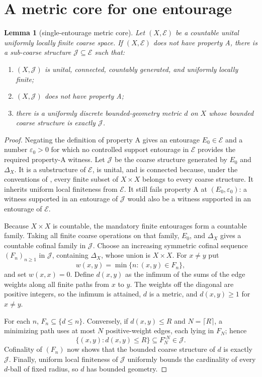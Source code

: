 \documentclass[11pt]{article}
\newtheorem{lemma}{Lemma}
\newcommand{\E}{\mathcal E}
\newcommand{\J}{\mathcal J}
\begin{document}
\section*{A metric core for one entourage}
\begin{lemma}[single-entourage metric core]\label{lem:core}
Let $(X,\E)$ be a countable unital uniformly locally finite coarse space.  If
$(X,\E)$ does not have property A, there is a sub-coarse structure
$\J\subseteq\E$ such that:
\begin{enumerate}[label=(\roman*)]
\item $(X,\J)$ is unital, connected, countably generated, and uniformly
locally finite;
\item $(X,\J)$ does not have property A;
\item there is a uniformly discrete bounded-geometry metric $d$ on $X$ whose
bounded coarse structure is exactly $\J$.
\end{enumerate}
\end{lemma}

\begin{proof}
Negating the definition of property A gives an entourage $E_0\in\E$ and a
number $\varepsilon_0>0$ for which no controlled support entourage in $\E$
provides the required property-A witness.  Let $\J$ be the coarse structure
generated by $E_0$ and $\Delta_X$.  It is a substructure of $\E$, is unital,
and is connected because, under the conventions of \cite{ChungDu}, every
finite subset of $X\times X$ belongs to every coarse structure.  It inherits
uniform local finiteness from $\E$.  It still fails property A at
$(E_0,\varepsilon_0)$: a witness supported in an entourage of $\J$ would also
be a witness supported in an entourage of $\E$.

Because $X\times X$ is countable, the mandatory finite entourages form a
countable family.  Taking all finite coarse operations on that family,
$E_0$, and $\Delta_X$ gives a countable cofinal family in $\J$.  Choose an
increasing symmetric cofinal sequence $(F_n)_{n\geq1}$ in $\J$, containing
$\Delta_X$, whose union is $X\times X$.  For $x\ne y$ put
\[
 w(x,y)=\min\{n:(x,y)\in F_n\},
\]
and set $w(x,x)=0$.  Define $d(x,y)$ as the infimum of the sums of the edge
weights along all finite paths from $x$ to $y$.  The weights off the diagonal
are positive integers, so the infimum is attained, $d$ is a metric, and
$d(x,y)\geq1$ for $x\ne y$.

For each $n$, $F_n\subseteq\{d\leq n\}$.  Conversely, if $d(x,y)\leq R$ and
$N=\lceil R\rceil$, a minimizing path uses at most $N$ positive-weight edges,
each lying in $F_N$; hence
\[
 \{(x,y):d(x,y)\leq R\}\subseteq F_N^{\circ N}\in\J.
\]
Cofinality of $(F_n)$ now shows that the bounded coarse structure of $d$ is
exactly $\J$.  Finally, uniform local finiteness of $\J$ uniformly bounds the
cardinality of every $d$-ball of fixed radius, so $d$ has bounded geometry.
\end{proof}
\end{document}
